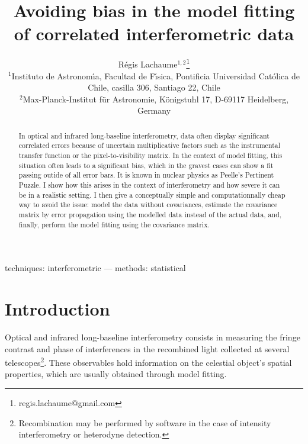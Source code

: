 \documentclass[a4paper,fleqn,usenatbib]{mnras}
\begin{document}
\title{Avoiding bias in the model fitting of correlated interferometric data}
\author{R\'egis Lachaume$^{1,2}$\thanks{regis.lachaume@gmail.com}
\\
$^{1}$Instituto de Astronom\'\i{}a, Facultad de F\'\i{}sica, Pontificia Universidad Cat\'olica de Chile, casilla 306, Santiago 22, Chile\\
$^{2}$Max-Planck-Institut f\"ur Astronomie, K\"onigstuhl 17, D-69117 Heidelberg, Germany
}
\maketitle

\begin{abstract}
In optical and infrared long-baseline interferometry, data often display significant correlated errors because of uncertain multiplicative factors such as the instrumental transfer function or the pixel-to-visibility matrix.  In the context of model fitting, this situation often leads to a significant bias, which in the gravest cases can show a fit passing outide of all error bars. It is known in nuclear physics as Peelle's Pertinent Puzzle.  I show how this arises in the context of interferometry and how severe it can be in a realistic setting.  I then give a conceptually simple and computationnally cheap way to avoid the issue: model the data without covariances, estimate the covariance matrix by error propagation using the modelled data instead of the actual data, and, finally, perform the model fitting using the covariance matrix.
\end{abstract}

\begin{keywords}
techniques: interferometric --- 
methods: statistical
\end{keywords}

\section{Introduction}

Optical and infrared long-baseline interferometry consists in measuring the fringe contrast and phase of interferences in the recombined light collected at several telescopes\footnote{Recombination may be performed by software in the case of intensity interferometry or heterodyne detection.}. These observables hold information on the celestial object's spatial properties, which are usually obtained through model fitting. 
\end{document}
